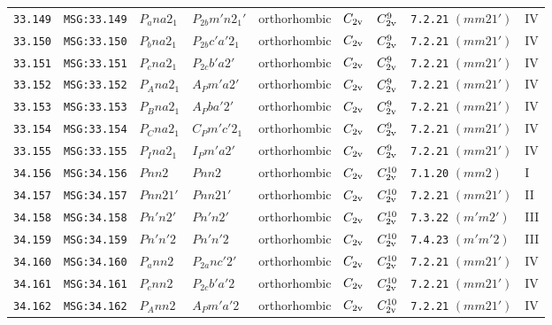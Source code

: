 \documentclass[fleqn,10pt]{jsarticle}
\begin{document}
\begin{center}
\begin{longtable}{lllllllll}
\texttt{33.149} & \texttt{MSG:33.149} & $P_{a}na2_{1}$ & $P_{2b}m'n2_{1}'$ & orthorhombic & $C_{\rm 2v}$ & $C_{\rm 2v}^{9}$ & \texttt{7.2.21} $(mm21')$ & IV \\
\texttt{33.150} & \texttt{MSG:33.150} & $P_{b}na2_{1}$ & $P_{2b}c'a'2_{1}$ & orthorhombic & $C_{\rm 2v}$ & $C_{\rm 2v}^{9}$ & \texttt{7.2.21} $(mm21')$ & IV \\
\texttt{33.151} & \texttt{MSG:33.151} & $P_{c}na2_{1}$ & $P_{2c}b'a2'$ & orthorhombic & $C_{\rm 2v}$ & $C_{\rm 2v}^{9}$ & \texttt{7.2.21} $(mm21')$ & IV \\
\texttt{33.152} & \texttt{MSG:33.152} & $P_{A}na2_{1}$ & $A_{P}m'a2'$ & orthorhombic & $C_{\rm 2v}$ & $C_{\rm 2v}^{9}$ & \texttt{7.2.21} $(mm21')$ & IV \\
\texttt{33.153} & \texttt{MSG:33.153} & $P_{B}na2_{1}$ & $A_{P}ba'2'$ & orthorhombic & $C_{\rm 2v}$ & $C_{\rm 2v}^{9}$ & \texttt{7.2.21} $(mm21')$ & IV \\
\texttt{33.154} & \texttt{MSG:33.154} & $P_{C}na2_{1}$ & $C_{P}m'c'2_{1}$ & orthorhombic & $C_{\rm 2v}$ & $C_{\rm 2v}^{9}$ & \texttt{7.2.21} $(mm21')$ & IV \\
\texttt{33.155} & \texttt{MSG:33.155} & $P_{I}na2_{1}$ & $I_{P}m'a2'$ & orthorhombic & $C_{\rm 2v}$ & $C_{\rm 2v}^{9}$ & \texttt{7.2.21} $(mm21')$ & IV \\ \hline
\texttt{34.156} & \texttt{MSG:34.156} & $Pnn2$ & $Pnn2$ & orthorhombic & $C_{\rm 2v}$ & $C_{\rm 2v}^{10}$ & \texttt{7.1.20} $(mm2)$ & I \\
\texttt{34.157} & \texttt{MSG:34.157} & $Pnn21'$ & $Pnn21'$ & orthorhombic & $C_{\rm 2v}$ & $C_{\rm 2v}^{10}$ & \texttt{7.2.21} $(mm21')$ & II \\
\texttt{34.158} & \texttt{MSG:34.158} & $Pn'n2'$ & $Pn'n2'$ & orthorhombic & $C_{\rm 2v}$ & $C_{\rm 2v}^{10}$ & \texttt{7.3.22} $(m'm2')$ & III \\
\texttt{34.159} & \texttt{MSG:34.159} & $Pn'n'2$ & $Pn'n'2$ & orthorhombic & $C_{\rm 2v}$ & $C_{\rm 2v}^{10}$ & \texttt{7.4.23} $(m'm'2)$ & III \\
\texttt{34.160} & \texttt{MSG:34.160} & $P_{a}nn2$ & $P_{2a}nc'2'$ & orthorhombic & $C_{\rm 2v}$ & $C_{\rm 2v}^{10}$ & \texttt{7.2.21} $(mm21')$ & IV \\
\texttt{34.161} & \texttt{MSG:34.161} & $P_{c}nn2$ & $P_{2c}b'a'2$ & orthorhombic & $C_{\rm 2v}$ & $C_{\rm 2v}^{10}$ & \texttt{7.2.21} $(mm21')$ & IV \\
\texttt{34.162} & \texttt{MSG:34.162} & $P_{A}nn2$ & $A_{P}m'a'2$ & orthorhombic & $C_{\rm 2v}$ & $C_{\rm 2v}^{10}$ & \texttt{7.2.21} $(mm21')$ & IV \\

\end{longtable}
\end{center}
\end{document}
